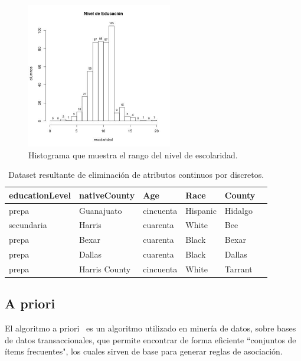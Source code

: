 \documentclass[sigconf]{acmart}
\begin{document}
\begin{figure}[ht]
  \centering
  \includegraphics[width=2.5in]{escolaridad.jpg}
  \caption{Histograma que muestra el rango del nivel de  escolaridad.}
  \label{fig:rangoEscolaridad}
\end{figure}


\begin{table}[hbt]
\begin{center}
\begin{tabular}{llllll}
\toprule
educationLevel &   nativeCounty &        Age &      Race &   County \\
\midrule
         prepa &     Guanajuato &  cincuenta &  Hispanic &  Hidalgo \\
     secundaria &         Harris &   cuarenta &     White &      Bee \\
         prepa &          Bexar &   cuarenta &     Black &    Bexar \\
         prepa &         Dallas &   cuarenta &     Black &   Dallas \\
        prepa &  Harris County &  cincuenta &     White &  Tarrant \\
\bottomrule
\end{tabular}
\label{categorias}
\caption{Dataset resultante de eliminación de atributos continuos por discretos.}
\end{center}
\end{table}

\subsection{A priori} 
El algoritmo a priori~\cite{Raschka-rules} es un algoritmo utilizado en minería de datos, sobre bases de datos transaccionales, que permite encontrar de forma eficiente ``conjuntos de ítems frecuentes", los cuales sirven de base para generar reglas de asociación.
\end{document}
